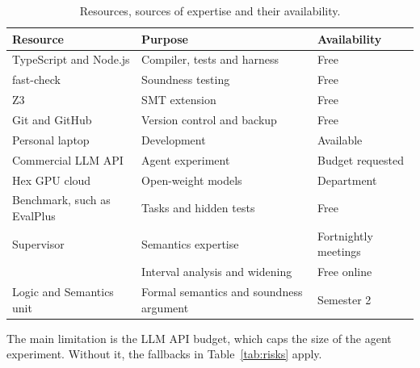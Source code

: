 \documentclass[11pt,a4paper,titlepage]{article}
\begin{document}
\begin{table}[H]
\centering
\small
\renewcommand{\arraystretch}{1.15}
\begin{tabular}{@{}l l l@{}}
\toprule
Resource & Purpose & Availability \\
\midrule
TypeScript and Node.js & Compiler, tests and harness & Free \\
fast-check & Soundness testing & Free \\
Z3 \parencite{demoura2008z3} & SMT extension & Free \\
Git and GitHub & Version control and backup & Free \\
Personal laptop & Development & Available \\
Commercial LLM API & Agent experiment & Budget requested \\
Hex GPU cloud & Open-weight models & Department \\
Benchmark, such as EvalPlus & Tasks and hidden tests & Free \\
Supervisor & Semantics expertise & Fortnightly meetings \\
\textcite{moller2026spa} & Interval analysis and widening & Free online \\
Logic and Semantics unit & Formal semantics and soundness argument & Semester 2 \\
\bottomrule
\end{tabular}
\caption{Resources, sources of expertise and their availability.}
\label{tab:resources}
\end{table}

The main limitation is the LLM API budget, which caps the size of the agent experiment. Without it, the fallbacks in Table~\ref{tab:risks} apply.

\newpage
\printbibliography
\end{document}
